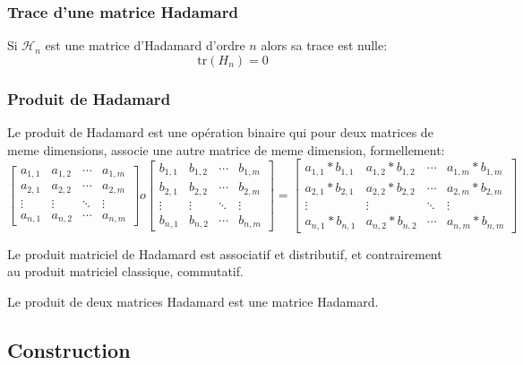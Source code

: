 \documentclass{article}
\begin{document}
\subsubsection{Trace d'une matrice Hadamard}

Si $\mathcal{H}_n$ est une matrice d'Hadamard d'ordre $n$ alors sa trace 
est nulle:
\begin{equation}\label{eq:trace}
	\mathrm{tr}(H_n) = 0
\end{equation}

\subsubsection{Produit de Hadamard}

Le produit de Hadamard est une opération binaire qui pour deux matrices de
meme dimensions, associe une autre matrice de meme dimension, formellement:
\begin{equation*}
	\begin{bmatrix}
		a_{1,1} & a_{1,2} & \cdots & a_{1,m}\\
		a_{2,1} & a_{2,2} & \cdots & a_{2,m}\\
		\vdots & \vdots & \ddots & \vdots\\
		a_{n,1} & a_{n,2} & \cdots & a_{n,m}
	\end{bmatrix}
	o
	\begin{bmatrix}
		b_{1,1} & b_{1,2} & \cdots & b_{1,m}\\
		b_{2,1} & b_{2,2} & \cdots & b_{2,m}\\
		\vdots & \vdots & \ddots & \vdots\\
		b_{n,1} & b_{n,2} & \cdots & b_{n,m}
	\end{bmatrix}
	=
	\begin{bmatrix}
		a_{1,1}*b_{1,1} & a_{1,2}*b_{1,2} & \cdots & a_{1,m}*b_{1,m}\\
		a_{2,1}*b_{2,1} & a_{2,2}*b_{2,2} & \cdots & a_{2,m}*b_{2,m}\\
		\vdots & \vdots & \ddots & \vdots\\
		a_{n,1}*b_{n,1} & a_{n,2}*b_{n,2} & \cdots & a_{n,m}*b_{n,m}
	\end{bmatrix}
\end{equation*}

Le produit matriciel de Hadamard est associatif et distributif, et 
contrairement au produit matriciel classique, commutatif. 

Le produit de deux matrices Hadamard est une matrice Hadamard.

\subsection{Construction}
\end{document}
